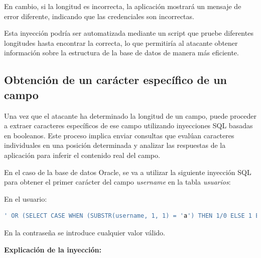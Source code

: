 \documentclass[a4paper,12pt]{article}
\begin{document}
En cambio, si la longitud es incorrecta, la aplicación mostrará un mensaje de error diferente, indicando que las credenciales son incorrectas.

\vspace{0,5cm}

Esta inyección podría ser automatizada mediante un script que pruebe diferentes longitudes hasta encontrar la correcta, lo que permitiría al atacante obtener información sobre la estructura de la base de datos de manera más eficiente.

\vspace{0,5cm}


\subsection{Obtención de un carácter específico de un campo}

Una vez que el atacante ha determinado la longitud de un campo, puede proceder a extraer caracteres específicos de ese campo utilizando inyecciones SQL basadas en booleanos. Este proceso implica enviar consultas que evalúan caracteres individuales en una posición determinada y analizar las respuestas de la aplicación para inferir el contenido real del campo.

\vspace{0,5cm}

En el caso de la base de datos Oracle, se va a utilizar la siguiente inyección SQL para obtener el primer carácter del campo \textit{username} en la tabla \textit{usuarios}:

\vspace{0,5cm}

En el usuario:

\begin{lstlisting}[language=SQL]
    ' OR (SELECT CASE WHEN (SUBSTR(username, 1, 1) = 'a') THEN 1/0 ELSE 1 END FROM (SELECT username, ROWNUM AS rn FROM Usuarios) WHERE rn=1) = 1 --
\end{lstlisting}

En la contraseña se introduce cualquier valor válido.

\vspace{0,5cm}

\textbf{Explicación de la inyección:}
\end{document}
